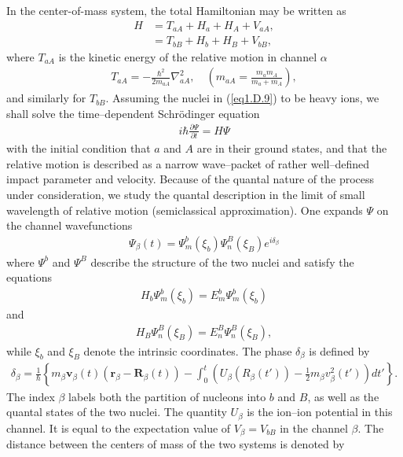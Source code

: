 \begin{subappendices}
In the center-of-mass system, the total Hamiltonian may be written as 
\begin{align}\label{eq1.D.10}
\nonumber H&=T_{aA}+H_a+H_A+V_{aA},\\
&=T_{bB}+H_b+H_B+V_{bB},
\end{align}
where $T_{aA}$ is the kinetic energy of the relative motion in channel $\alpha$
\begin{align}\label{eq1.D.11}
T_{aA}=-\frac{\hbar^2}{2m_{aA}}\nabla^2_{aA},\quad (m_{aA}=\frac{m_am_A}{m_a+m_A}),
\end{align}
and similarly for $T_{bB}$. Assuming the nuclei in (\ref{eq1.D.9}) to be heavy ions, we shall solve the time--dependent Schr\"odinger equation
\begin{align}\label{eq1.D.12}
i\hbar\frac{\partial\Psi}{\partial t}=H\Psi
\end{align}
with the initial condition that $a$ and $A$ are in their ground states, and that the relative motion is described as a narrow wave--packet of rather well--defined impact parameter and velocity. Because of the quantal nature of the process under consideration, we study the quantal description in the limit of small wavelength of relative motion (semiclassical approximation). One expands $\Psi$ on the channel wavefunctions
\begin{align}\label{eq1.D.13}
\Psi_\beta(t)=\Psi_m^b(\xi_b)\Psi_n^B(\xi_B)e^{i\delta_\beta}
\end{align}
where $\Psi^b$ and $\Psi^B$ describe the structure of the two nuclei and satisfy the equations 
\begin{align}\label{eq1.D.14}
H_b\Psi_m^b(\xi_b)=E_m^b\Psi_m^b(\xi_b)
\end{align}
and
\begin{align}\label{eq1.D.15}
H_B\Psi_n^B(\xi_B)=E_n^B\Psi_n^B(\xi_B),
\end{align}
while $\xi_b$ and $\xi_B$ denote the intrinsic coordinates. The phase $\delta_\beta$ is defined by
\begin{align}\label{eq1.D.16}
\delta_\beta=\frac{1}{\hbar}\left\{m_\beta\mathbf v_\beta(t)(\mathbf r_\beta-\mathbf R_\beta(t))-\int_0^t\left(U_\beta(R_\beta(t'))-\frac{1}{2}m_\beta v^2_\beta(t')\right)dt'\right\}.
\end{align}
The index $\beta$ labels both the partition of nucleons into $b$ and $B$, as well as the quantal states of the two nuclei. The quantity $U_\beta$ is the ion--ion potential in this channel. It is equal to the expectation value of $V_\beta=V_{bB}$ in the channel $\beta$. The distance between the centers of mass of the two systems is denoted by

\end{subappendices}
